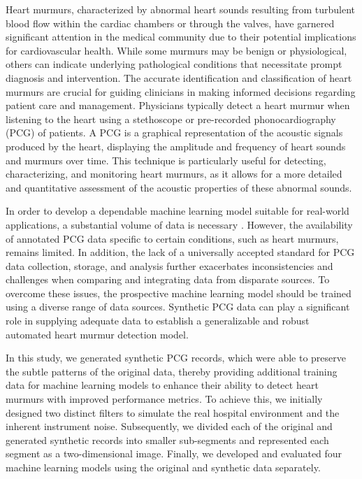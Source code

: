 \documentclass{article}
\begin{document}
\par Heart murmurs, characterized by abnormal heart sounds resulting from turbulent blood flow within the cardiac chambers or through the valves, have garnered significant attention in the medical community due to their potential implications for cardiovascular health. While some murmurs may be benign or physiological, others can indicate underlying pathological conditions that necessitate prompt diagnosis and intervention. The accurate identification and classification of heart murmurs are crucial for guiding clinicians in making informed decisions regarding patient care and management. Physicians typically detect a heart murmur when listening to the heart using a stethoscope or pre-recorded phonocardiography (PCG) of patients. A PCG is a graphical representation of the acoustic signals produced by the heart, displaying the amplitude and frequency of heart sounds and murmurs over time. This technique is particularly useful for detecting, characterizing, and monitoring heart murmurs, as it allows for a more detailed and quantitative assessment of the acoustic properties of these abnormal sounds.

\par In order to develop a dependable machine learning model suitable for real-world applications, a substantial volume of data is necessary \cite{alom2019state}. However, the availability of annotated PCG data specific to certain conditions, such as heart murmurs, remains limited. In addition, the lack of a universally accepted standard for PCG data collection, storage, and analysis further exacerbates inconsistencies and challenges when comparing and integrating data from disparate sources. To overcome these issues, the prospective machine learning model should be trained using a diverse range of data sources. Synthetic PCG data can play a significant role in supplying adequate data to establish a generalizable and robust automated heart murmur detection model.


\par In this study, we generated synthetic PCG records, which were able to preserve the subtle patterns of the original data, thereby providing additional training data for machine learning models to enhance their ability to detect heart murmurs with improved performance metrics. To achieve this, we initially designed two distinct filters to simulate the real hospital environment and the inherent instrument noise. Subsequently, we divided each of the original and generated synthetic records into smaller sub-segments and represented each segment as a two-dimensional image. Finally, we developed and evaluated four machine learning models using the original and synthetic data separately.
\end{document}
